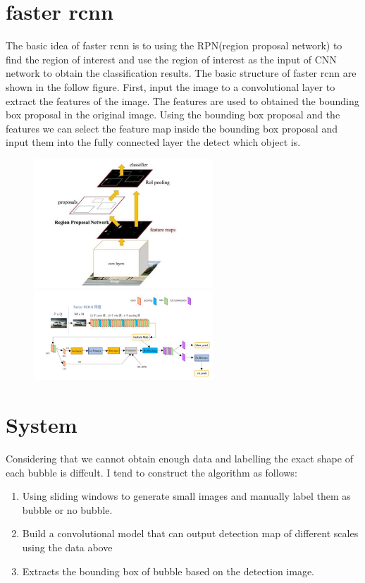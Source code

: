 \documentclass[11pt]{elegantpaper}
\begin{document}
\section{faster rcnn}
The basic idea of faster rcnn is to using the RPN(region proposal network) to find the region of interest and use the region of interest as the input of 
CNN network to obtain the classification results. The basic structure of faster rcnn are shown in the follow figure. First, input the image to a convolutional layer 
to extract the features of the image. The features are used to obtained the bounding box proposal in the original image. Using the bounding box proposal and the features
we can select the feature map inside the bounding box proposal and input them into the fully connected layer the detect which object is. 
\begin{figure}[htbp]
    \centering
    \includegraphics[width=0.6\textwidth]{image/fasterrcnn.png}
    \includegraphics[width=0.6\textwidth]{image/faster_rcnn_1.png}
\end{figure}

\section{System}
Considering that we cannot obtain enough data and labelling the exact shape of each bubble is diffcult. I tend to construct the algorithm as follows:

\begin{enumerate}
	\item Using sliding windows to generate small images and manually label them as bubble or no bubble.
	\item Build a convolutional model that can output detection map of different scales using the data above 
	\item Extracts the bounding box of bubble based on the detection image.
\end{enumerate}

    
\end{document}
